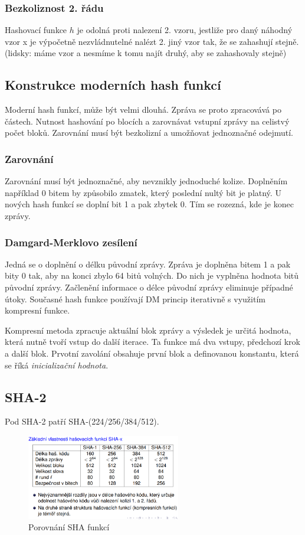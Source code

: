 \documentclass{szzclass}
\begin{document}
\subsubsection{Bezkoliznost 2. řádu}
Hashovací funkce $h$ je odolná proti nalezení 2. vzoru, jestliže pro daný náhodný vzor x je výpočetně nezvládnutelné nalézt 2. jiný vzor tak, že se
zahashují stejně. (lidsky: máme vzor a nesmíme k tomu najít druhý, aby se zahashovaly stejně)
\subsection{Konstrukce moderních hash funkcí}
Moderní hash funkcí, může být velmi dlouhá. Zpráva se proto zpracovává po částech. Nutnost hashování po blocích a zarovnávat vstupní zprávy na celistvý počet bloků.
Zarovnání musí být bezkolizní a umožňovat jednoznačné odejmutí.
\subsubsection{Zarovnání}
Zarovnání musí být jednoznačné, aby nevznikly jednoduché kolize. Doplněním například 0 bitem by způsobilo zmatek, který poslední nultý bit je platný.
U nových hash funkcí se doplní bit 1 a pak zbytek 0. Tím se rozezná, kde je konec zprávy.
\subsubsection{Damgard-Merklovo zesílení}
Jedná se o doplnění o délku původní zprávy. Zpráva je doplněna bitem 1 a pak bity 0 tak, aby na konci zbylo 64 bitů volných. Do nich je vyplněna hodnota
 bitů původní zprávy. Začlenění informace o délce původní zprávy eliminuje případné útoky. Současné hash funkce používají DM princip iterativně s využitím kompresní funkce.

Kompresní metoda zpracuje aktuální blok zprávy a výsledek je určitá hodnota, která nutně tvoří vstup do další iterace. Ta funkce má dva vstupy, předchozí krok a další blok.
Prvotní zavolání obsahuje první blok a definovanou konstantu, která se říká \textit{inicializační hodnota}.

\subsection{SHA-2}
Pod SHA-2 patří SHA-(224/256/384/512).

\begin{figure}[h!]
    \centering
    \includegraphics[width=0.6\textwidth]{topics/bi-spol-06/image/shaCompare.png}
    \caption{Porovnání SHA funkcí}
\end{figure}
\end{document}
